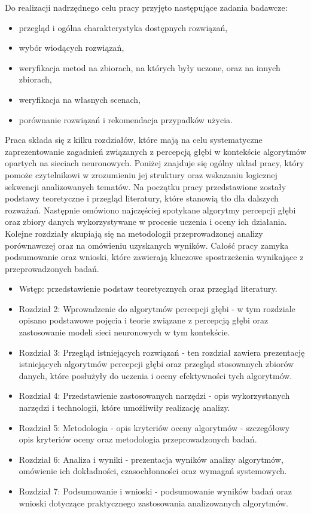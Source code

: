 Do realizacji nadrzędnego celu pracy przyjęto następujące zadania badawcze:
\begin{itemize}
    \item przegląd i ogólna charakterystyka dostępnych rozwiązań,
    \item wybór wiodących rozwiązań,
    \item weryfikacja metod na zbiorach, na których były uczone, oraz na innych zbiorach,
    \item weryfikacja na własnych scenach,
    \item porównanie rozwiązań i rekomendacja przypadków użycia.
\end{itemize}

Praca składa się z kilku rozdziałów, które mają na celu systematyczne zaprezentowanie zagadnień związanych z percepcją głębi w kontekście algorytmów opartych na sieciach neuronowych. Poniżej znajduje się ogólny układ pracy, który pomoże czytelnikowi w zrozumieniu jej struktury oraz wskazaniu logicznej sekwencji analizowanych tematów.
Na początku pracy przedstawione zostały podstawy teoretyczne i przegląd literatury, które stanowią tło dla dalszych rozważań. Następnie omówiono najczęściej spotykane algorytmy percepcji głębi oraz zbiory danych wykorzystywane w procesie uczenia i oceny ich działania. Kolejne rozdziały skupiają się na metodologii przeprowadzonej analizy porównawczej oraz na omówieniu uzyskanych wyników. Całość pracy zamyka podsumowanie oraz wnioski, które zawierają kluczowe spostrzeżenia wynikające z przeprowadzonych badań.

\begin{itemize}
    \item Wstęp: przedstawienie podstaw teoretycznych oraz przegląd literatury.

    \item Rozdział 2: Wprowadzenie do algorytmów percepcji głębi - w tym rozdziale opisano podstawowe pojęcia i teorie związane z percepcją głębi oraz zastosowanie modeli sieci neuronowych w tym kontekście.

    \item Rozdział 3: Przegląd istniejących rozwiązań - ten rozdział zawiera prezentację istniejących algorytmów percepcji głębi oraz przegląd stosowanych zbiorów danych, które posłużyły do uczenia i oceny efektywności tych algorytmów.
    
    \item Rozdział 4: Przedstawienie zastosowanych narzędzi - opis wykorzystanych narzędzi i technologii, które umożliwiły realizację analizy.
    
    \item Rozdział 5: Metodologia - opis kryteriów oceny algorytmów - szczegółowy opis kryteriów oceny oraz metodologia przeprowadzonych badań.
    
    \item Rozdział 6: Analiza i wyniki - prezentacja wyników analizy algorytmów, omówienie ich dokładności, czasochłonności oraz wymagań systemowych.
    
    \item Rozdział 7: Podsumowanie i wnioski - podsumowanie wyników badań oraz wnioski dotyczące praktycznego zastosowania analizowanych algorytmów.
\end{itemize}
